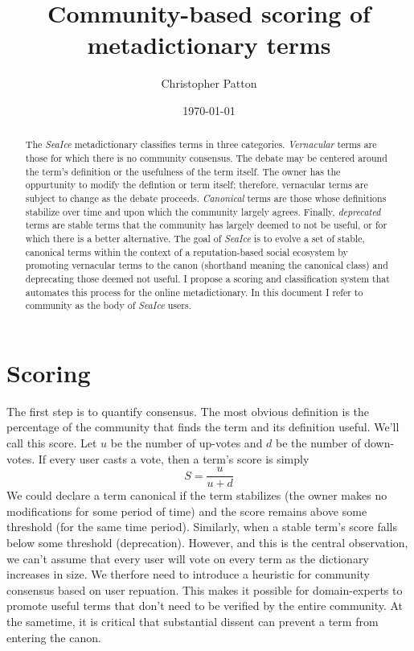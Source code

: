 \documentclass[letter]{article}
\author{Christopher Patton}
\date{\today}
\title{Community-based scoring of metadictionary terms}
\begin{document}
\maketitle

\begin{abstract}
The \textit{SeaIce} metadictionary classifies terms in three categories. \textit{Vernacular} 
terms are those for which there is no community consensus. The debate may be centered around
the term's definition or the usefulness of the term itself. The owner has the oppurtunity to 
modify the defintion or term itself; therefore, vernacular terms are subject to 
change as the debate proceeds. \textit{Canonical} terms are those whose definitions stabilize
over time and upon which the community largely agrees. Finally, \textit{deprecated} terms 
are stable terms that the community has largely deemed to not be useful, or for which there is a 
better alternative. The goal of 
\textit{SeaIce} is to evolve a set of stable, canonical terms within the context of a reputation-based 
social ecosystem by promoting vernacular terms to the canon (shorthand meaning the canonical class) and deprecating those deemed 
not useful. I propose a scoring and classification system that automates this process 
for the online metadictionary. In this document I refer to community as the body of \textit{SeaIce} users. 
\end{abstract}


\section{Scoring}
The first step is to quantify consensus. The most obvious definition is the percentage of the 
community that finds the term and its definition useful. We'll call this score. Let $u$ be the 
number of up-votes and $d$ be the number of down-votes. If every user casts a vote, then a 
term's score is simply 
$$ S = \frac{u}{u+d} $$
We could declare a term canonical if the term stabilizes (the owner makes no modifications for some
period of time) and the score remains above some threshold (for the same time period). Similarly, 
when a stable term's score falls below some threshold (deprecation). However, and this is the central observation, we
can't assume that every user will vote on every term as the dictionary increases in size. 
We therfore need to introduce a heuristic for community consensus based on user repuation. This
makes it possible for domain-experts to promote useful terms that don't need to be verified 
by the entire community. At the sametime, it is critical that substantial dissent can prevent
a term from entering the canon. 
\end{document}
